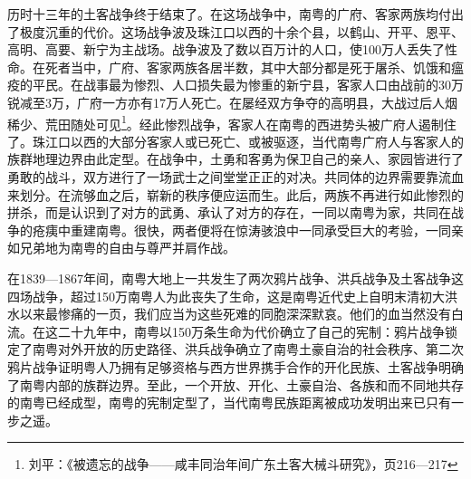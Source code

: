 历时十三年的土客战争终于结束了。在这场战争中，南粤的广府、客家两族均付出了极度沉重的代价。这场战争波及珠江口以西的十余个县，以鹤山、开平、恩平、高明、高要、新宁为主战场。战争波及了数以百万计的人口，使100万人丢失了性命。在死者当中，广府、客家两族各居半数，其中大部分都是死于屠杀、饥饿和瘟疫的平民。在战事最为惨烈、人口损失最为惨重的新宁县，客家人口由战前的30万锐减至3万，广府一方亦有17万人死亡。在屡经双方争夺的高明县，大战过后人烟稀少、荒田随处可见\footnote{刘平：《被遗忘的战争——咸丰同治年间广东土客大械斗研究》，页216—217}。经此惨烈战争，客家人在南粤的西进势头被广府人遏制住了。珠江口以西的大部分客家人或已死亡、或被驱逐，当代南粤广府人与客家人的族群地理边界由此定型。在战争中，土勇和客勇为保卫自己的亲人、家园皆进行了勇敢的战斗，双方进行了一场武士之间堂堂正正的对决。共同体的边界需要靠流血来划分。在流够血之后，崭新的秩序便应运而生。此后，两族不再进行如此惨烈的拼杀，而是认识到了对方的武勇、承认了对方的存在，一同以南粤为家，共同在战争的疮痍中重建南粤。很快，两者便将在惊涛骇浪中一同承受巨大的考验，一同亲如兄弟地为南粤的自由与尊严并肩作战。

在1839—1867年间，南粤大地上一共发生了两次鸦片战争、洪兵战争及土客战争这四场战争，超过150万南粤人为此丧失了生命，这是南粤近代史上自明末清初大洪水以来最惨痛的一页，我们应当为这些死难的同胞深深默哀。他们的血当然没有白流。在这二十九年中，南粤以150万条生命为代价确立了自己的宪制：鸦片战争锁定了南粤对外开放的历史路径、洪兵战争确立了南粤土豪自治的社会秩序、第二次鸦片战争证明粤人乃拥有足够资格与西方世界携手合作的开化民族、土客战争明确了南粤内部的族群边界。至此，一个开放、开化、土豪自治、各族和而不同地共存的南粤已经成型，南粤的宪制定型了，当代南粤民族距离被成功发明出来已只有一步之遥。










